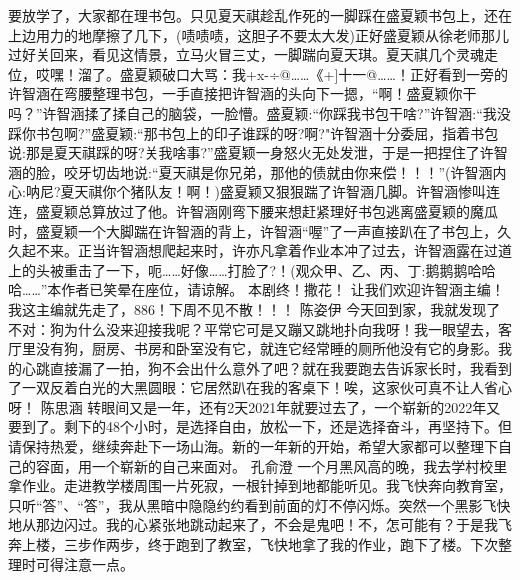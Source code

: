 {}要放学了，大家都在理书包。只见夏天祺趁乱作死的一脚踩在盛夏颖书包上，还在上边用力的地摩擦了几下，(啧啧啧，这胆子不要太大发)正好盛夏颖从徐老师那儿过好关回来，看见这情景，立马火冒三丈，一脚踹向夏天琪。夏天祺几个灵魂走位，哎嘿！溜了。盛夏颖破口大骂：我+x-÷@……《+]十一@……！正好看到一旁的许智涵在弯腰整理书包，一手直接把许智涵的头向下一摁，“啊！盛夏颖你干吗？”许智涵揉了揉自己的脑袋，一脸懵。盛夏颖:“你踩我书包干啥?”许智涵:“我没踩你书包啊?”盛夏颖:“那书包上的印子谁踩的呀?啊?"许智涵十分委屈，指着书包说:\markdownRendererTilde{}那是夏天祺踩的呀?关我啥事?”盛夏颖一身怒火无处发泄，于是一把捏住了许智涵的脸，咬牙切齿地说:“夏天祺是你兄弟，那他的债就由你来偿！！！”(许智涵内心:呐尼?夏天祺你个猪队友！啊！)盛夏颖又狠狠踹了许智涵几脚。许智涵惨叫连连，盛夏颖总算放过了他。许智涵刚弯下腰来想赶紧理好书包逃离盛夏颖的魔瓜时，盛夏颖一个大脚踹在许智涵的背上，许智涵“喔”了一声直接趴在了书包上，久久起不来。正当许智涵想爬起来时，许亦凡拿着作业本冲了过去，许智涵露在过道上的头被重击了一下，呃……好像……打脸了?！(观众甲、乙、丙、丁:鹅鹅鹅哈哈哈……”本作者已笑晕在座位，请谅解。\markdownRendererInterblockSeparator
{}本剧终！撒花！\markdownRendererInterblockSeparator
{}让我们欢迎许智涵主编！我这主编就先走了，886！下周不见不散！！！\markdownRendererInterblockSeparator
{}\markdownRendererInterblockSeparator
{}陈姿伊\markdownRendererInterblockSeparator
{}今天回到家，我就发现了不对：狗为什么没来迎接我呢？平常它可是又蹦又跳地扑向我呀！我一眼望去，客厅里没有狗，厨房、书房和卧室没有它，就连它经常睡的厕所他没有它的身影。我的心跳直接漏了一拍，狗不会出什么意外了吧？就在我要跑去告诉家长时，我看到了一双反着白光的大黑圆眼：它居然趴在我的客桌下！唉，这家伙可真不让人省心呀！\markdownRendererInterblockSeparator
{}\markdownRendererInterblockSeparator
{}陈思涵\markdownRendererInterblockSeparator
{}转眼间又是一年，还有2天2021年就要过去了，一个崭新的2022年又要到了。剩下的48个小时，是选择自由，放松一下，还是选择奋斗，再坚持下。但请保持热爱，继续奔赴下一场山海。新的一年新的开始，希望大家都可以整理下自己的容面，用一个崭新的自己来面对。\markdownRendererInterblockSeparator
{}\markdownRendererInterblockSeparator
{}孔俞澄\markdownRendererInterblockSeparator
{}一个月黑风高的晚，我去学村校里拿作业。走进教学楼周围一片死寂，一根针掉到地都能听见。我飞快奔向教育室，只听“答”、“答”，我从黑暗中隐隐约约看到前面的灯不停闪烁。突然一个黑影飞快地从那边闪过。我的心紧张地跳动起来了，不会是鬼吧！不，怎可能有？于是我飞奔上楼，三步作两步，终于跑到了教室，飞快地拿了我的作业，跑下了楼。下次整理时可得注意一点。\markdownRendererInterblockSeparator

